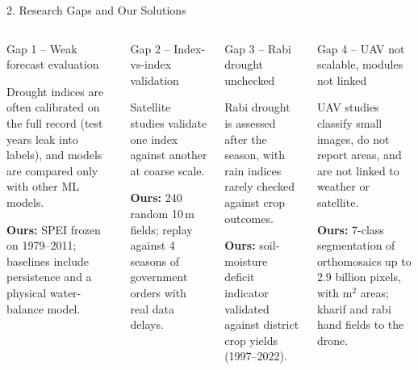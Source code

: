 \documentclass[aspectratio=169,10pt]{beamer}
\begin{document}
\begin{frame}[t]{2. Research Gaps and Our Solutions}
\vspace{-5mm}
\begin{columns}[T,onlytextwidth]
\begin{warncard}[equal height group=gaprow1]{Gap 1 -- Weak forecast evaluation}
\small\raggedright{} Drought indices are often calibrated on the full record (test years leak into labels), and models are compared only with other ML models.\par\vspace{3pt}
\textcolor{good}{\textbf{Ours:}} SPEI frozen on 1979--2011; baselines include persistence and a physical water-balance model.
\end{warncard}
\vspace{1mm}
\begin{warncard}[equal height group=gaprow2]{Gap 2 -- Index-vs-index validation}
\small\raggedright{} Satellite studies validate one index against another at coarse scale.\par\vspace{3pt}
\textcolor{good}{\textbf{Ours:}} 240 random 10\,m fields; replay against 4 seasons of government orders with real data delays.
\end{warncard}
\begin{warncard}[equal height group=gaprow1]{Gap 3 -- Rabi drought unchecked}
\small\raggedright{} Rabi drought is assessed after the season, with rain indices rarely checked against crop outcomes.\par\vspace{3pt}
\textcolor{good}{\textbf{Ours:}} soil-moisture deficit indicator validated against district crop yields (1997--2022).
\end{warncard}
\vspace{1mm}
\begin{warncard}[equal height group=gaprow2]{Gap 4 -- UAV not scalable, modules not linked}
\small\raggedright{} UAV studies classify small images, do not report areas, and are not linked to weather or satellite.\par\vspace{3pt}
\textcolor{good}{\textbf{Ours:}} 7-class segmentation of orthomosaics up to 2.9 billion pixels, with m$^2$ areas; kharif and rabi hand fields to the drone.
\end{warncard}
\end{columns}
\end{frame}
\end{document}
